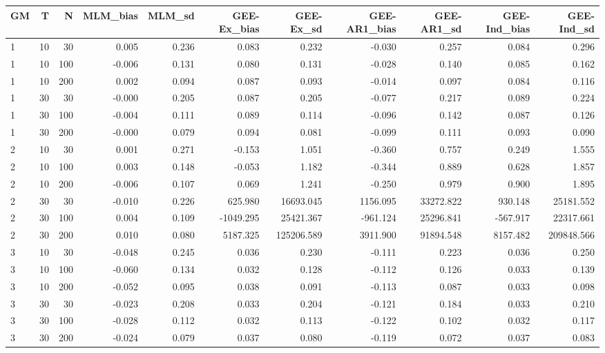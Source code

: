 \begin{table}[ht]
\centering
\begin{tabular}{lrrrrrrrrrr}
  \hline
GM & T & N & MLM\_bias & MLM\_sd & GEE-Ex\_bias & GEE-Ex\_sd & GEE-AR1\_bias & GEE-AR1\_sd & GEE-Ind\_bias & GEE-Ind\_sd \\ 
  \hline
1 & 10 & 30 & 0.005 & 0.236 & 0.083 & 0.232 & -0.030 & 0.257 & 0.084 & 0.296 \\ 
  1 & 10 & 100 & -0.006 & 0.131 & 0.080 & 0.131 & -0.028 & 0.140 & 0.085 & 0.162 \\ 
  1 & 10 & 200 & 0.002 & 0.094 & 0.087 & 0.093 & -0.014 & 0.097 & 0.084 & 0.116 \\ 
  1 & 30 & 30 & -0.000 & 0.205 & 0.087 & 0.205 & -0.077 & 0.217 & 0.089 & 0.224 \\ 
  1 & 30 & 100 & -0.004 & 0.111 & 0.089 & 0.114 & -0.096 & 0.142 & 0.087 & 0.126 \\ 
  1 & 30 & 200 & -0.000 & 0.079 & 0.094 & 0.081 & -0.099 & 0.111 & 0.093 & 0.090 \\ 
  2 & 10 & 30 & 0.001 & 0.271 & -0.153 & 1.051 & -0.360 & 0.757 & 0.249 & 1.555 \\ 
  2 & 10 & 100 & 0.003 & 0.148 & -0.053 & 1.182 & -0.344 & 0.889 & 0.628 & 1.857 \\ 
  2 & 10 & 200 & -0.006 & 0.107 & 0.069 & 1.241 & -0.250 & 0.979 & 0.900 & 1.895 \\ 
  2 & 30 & 30 & -0.010 & 0.226 & 625.980 & 16693.045 & 1156.095 & 33272.822 & 930.148 & 25181.552 \\ 
  2 & 30 & 100 & 0.004 & 0.109 & -1049.295 & 25421.367 & -961.124 & 25296.841 & -567.917 & 22317.661 \\ 
  2 & 30 & 200 & 0.010 & 0.080 & 5187.325 & 125206.589 & 3911.900 & 91894.548 & 8157.482 & 209848.566 \\ 
  3 & 10 & 30 & -0.048 & 0.245 & 0.036 & 0.230 & -0.111 & 0.223 & 0.036 & 0.250 \\ 
  3 & 10 & 100 & -0.060 & 0.134 & 0.032 & 0.128 & -0.112 & 0.126 & 0.033 & 0.139 \\ 
  3 & 10 & 200 & -0.052 & 0.095 & 0.038 & 0.091 & -0.113 & 0.087 & 0.033 & 0.098 \\ 
  3 & 30 & 30 & -0.023 & 0.208 & 0.033 & 0.204 & -0.121 & 0.184 & 0.033 & 0.210 \\ 
  3 & 30 & 100 & -0.028 & 0.112 & 0.032 & 0.113 & -0.122 & 0.102 & 0.032 & 0.117 \\ 
  3 & 30 & 200 & -0.024 & 0.079 & 0.037 & 0.080 & -0.119 & 0.072 & 0.037 & 0.083 \\ 

\end{tabular}
\end{table}
